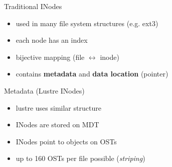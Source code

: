 \begin{frame}{Traditional INodes}
    \begin{itemize}
        \item used in many file system structures (e.g. ext3)
        \item each node has an index
        \item bijective mapping (file $\leftrightarrow$ inode)
        \item contains \textbf{metadata} and \textbf{data location} (pointer)
    \end{itemize}
\end{frame}

\begin{frame}{Metadata (Lustre INodes)}
    \begin{itemize}
        \item lustre uses similar structure
        \item INodes are stored on MDT
        \item INodes point to objects on OSTs
        \item up to 160 OSTs per file possible (\emph{striping})
    \end{itemize}
\end{frame}

